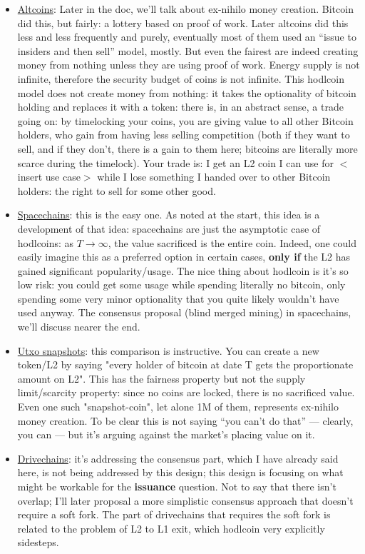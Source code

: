 \documentclass[11pt,a4paper]{article}
\begin{document}
\begin{itemize}
\item \underline{Altcoins}: Later in the doc, we'll talk about ex-nihilo money creation. Bitcoin did this, but fairly: a lottery based on proof of work. Later altcoins did this less and less frequently and purely, eventually most of them used an ``issue to insiders and then sell'' model, mostly. But even the fairest are indeed creating money from nothing unless they are using proof of work. Energy supply is not infinite, therefore the security budget of coins is not infinite. This hodlcoin model does not create money from nothing: it takes the optionality of bitcoin holding and replaces it with a token: there is, in an abstract sense, a trade going on: by timelocking your coins, you are giving value to all other Bitcoin holders, who gain from having less selling competition (both if they want to sell, and if they don't, there is a gain to them here; bitcoins are literally more scarce during the timelock). Your trade is: I get an L2 coin I can use for $<$insert use case$>$ while I lose something I handed over to other Bitcoin holders: the right to sell for some other good.
\item \underline{Spacechains}: this is the easy one. As noted at the start, this idea is a development of that idea: spacechains are just the asymptotic case of hodlcoins: as $T \rightarrow \infty$, the value sacrificed is the entire coin. Indeed, one could easily imagine this as a preferred option in certain cases, \textbf{only if} the L2 has gained significant popularity/usage. The nice thing about hodlcoin is it's so low risk: you could get some usage while spending literally no bitcoin, only spending some very minor optionality that you quite likely wouldn't have used anyway. The consensus proposal (blind merged mining) in spacechains, we'll discuss nearer the end.
\item \underline{Utxo snapshots}: this comparison is instructive. You can create a new token/L2 by saying "every holder of bitcoin at date T gets the proportionate amount on L2". This has the fairness property but not the supply limit/scarcity property: since no coins are locked, there is no sacrificed value. Even one such "snapshot-coin", let alone 1M of them, represents ex-nihilo money creation. To be clear this is not saying ``you can't do that'' --- clearly, you can --- but it's arguing against the market's placing value on it.
\item \underline{Drivechains}: it's addressing the consensus part, which I have already said here, is not being addressed by this design; this design is focusing on what might be workable for the \textbf{issuance} question. Not to say that there isn't overlap; I'll later proposal a more simplistic consensus approach that doesn't require a soft fork. The part of drivechains that requires the soft fork is related to the problem of L2 to L1 exit, which hodlcoin very explicitly sidesteps.

\end{itemize}
\end{document}
